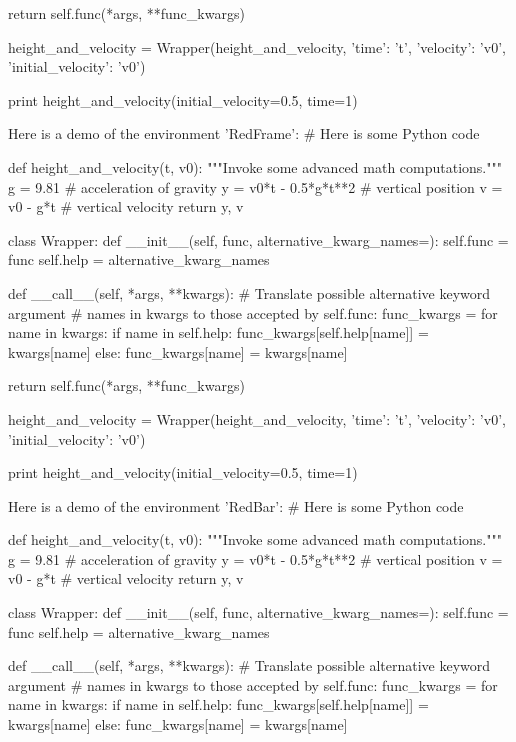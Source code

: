         return self.func(*args, **func_kwargs)

height_and_velocity = Wrapper(height_and_velocity,
                              {'time': 't',
                               'velocity': 'v0',
                               'initial_velocity': 'v0'})

print height_and_velocity(initial_velocity=0.5, time=1)


\noindent
Here is a demo of the environment 'RedFrame':
# Here is some Python code

def height_and_velocity(t, v0):
    """Invoke some advanced math computations."""
    g = 9.81                  # acceleration of gravity
    y = v0*t - 0.5*g*t**2     # vertical position
    v = v0 - g*t              # vertical velocity
    return y, v

class Wrapper:
    def __init__(self, func, alternative_kwarg_names={}):
        self.func = func
        self.help = alternative_kwarg_names

    def __call__(self, *args, **kwargs):
        # Translate possible alternative keyword argument
        # names in kwargs to those accepted by self.func:
        func_kwargs = {}
        for name in kwargs:
            if name in self.help:
                func_kwargs[self.help[name]] = kwargs[name]
            else:
                func_kwargs[name] = kwargs[name]

        return self.func(*args, **func_kwargs)

height_and_velocity = Wrapper(height_and_velocity,
                              {'time': 't',
                               'velocity': 'v0',
                               'initial_velocity': 'v0'})

print height_and_velocity(initial_velocity=0.5, time=1)


\noindent
Here is a demo of the environment 'RedBar':
# Here is some Python code

def height_and_velocity(t, v0):
    """Invoke some advanced math computations."""
    g = 9.81                  # acceleration of gravity
    y = v0*t - 0.5*g*t**2     # vertical position
    v = v0 - g*t              # vertical velocity
    return y, v

class Wrapper:
    def __init__(self, func, alternative_kwarg_names={}):
        self.func = func
        self.help = alternative_kwarg_names

    def __call__(self, *args, **kwargs):
        # Translate possible alternative keyword argument
        # names in kwargs to those accepted by self.func:
        func_kwargs = {}
        for name in kwargs:
            if name in self.help:
                func_kwargs[self.help[name]] = kwargs[name]
            else:
                func_kwargs[name] = kwargs[name]

